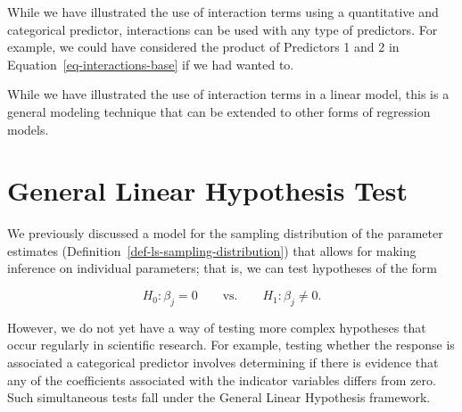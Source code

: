 \documentclass[
  letterpaper,
  DIV=11,
  numbers=noendperiod]{scrreprt}
\theoremstyle{definition}
\theoremstyle{definition}
\theoremstyle{remark}
\begin{document}
\begin{tcolorbox}[enhanced jigsaw, bottomrule=.15mm, titlerule=0mm, bottomtitle=1mm, colback=white, coltitle=black, rightrule=.15mm, leftrule=.75mm, toprule=.15mm, toptitle=1mm, left=2mm, opacityback=0, colframe=quarto-callout-note-color-frame, breakable, title=\textcolor{quarto-callout-note-color}{\faInfo}\hspace{0.5em}{Note}, arc=.35mm, colbacktitle=quarto-callout-note-color!10!white, opacitybacktitle=0.6]

While we have illustrated the use of interaction terms using a
quantitative and categorical predictor, interactions can be used with
any type of predictors. For example, we could have considered the
product of Predictors 1 and 2 in Equation~\ref{eq-interactions-base} if
we had wanted to.

\end{tcolorbox}

While we have illustrated the use of interaction terms in a linear
model, this is a general modeling technique that can be extended to
other forms of regression models.

\hypertarget{sec-modeling-linear-hypotheses}{%
\chapter{General Linear Hypothesis
Test}\label{sec-modeling-linear-hypotheses}}

\providecommand{\norm}[1]{\lVert#1\rVert}
\providecommand{\abs}[1]{\lvert#1\rvert}
\providecommand{\dist}[1]{\stackrel{\text{#1}}{\sim}}
\providecommand{\ind}[1]{\mathbb{I}\left(#1\right)}
\providecommand{\bm}[1]{\mathbf{#1}}
\providecommand{\bs}[1]{\boldsymbol{#1}}
\providecommand{\Ell}{\mathcal{L}}
\providecommand{\indep}{\perp\negthickspace\negmedspace\perp}

We previously discussed a model for the sampling distribution of the
parameter estimates (Definition~\ref{def-ls-sampling-distribution}) that
allows for making inference on individual parameters; that is, we can
test hypotheses of the form

\[H_0: \beta_j = 0 \qquad \text{vs.} \qquad H_1: \beta_j \neq 0.\]

However, we do not yet have a way of testing more complex hypotheses
that occur regularly in scientific research. For example, testing
whether the response is associated a categorical predictor involves
determining if there is evidence that any of the coefficients associated
with the indicator variables differs from zero. Such simultaneous tests
fall under the General Linear Hypothesis framework.
\end{document}
